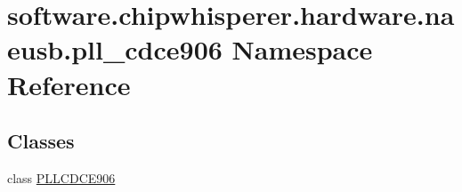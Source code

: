 \hypertarget{namespacesoftware_1_1chipwhisperer_1_1hardware_1_1naeusb_1_1pll__cdce906}{}\section{software.\+chipwhisperer.\+hardware.\+naeusb.\+pll\+\_\+cdce906 Namespace Reference}
\label{namespacesoftware_1_1chipwhisperer_1_1hardware_1_1naeusb_1_1pll__cdce906}
\subsection*{Classes}
\begin{DoxyCompactItemize}
\item 
class \hyperlink{classsoftware_1_1chipwhisperer_1_1hardware_1_1naeusb_1_1pll__cdce906_1_1PLLCDCE906}{P\+L\+L\+C\+D\+C\+E906}
\end{DoxyCompactItemize}

